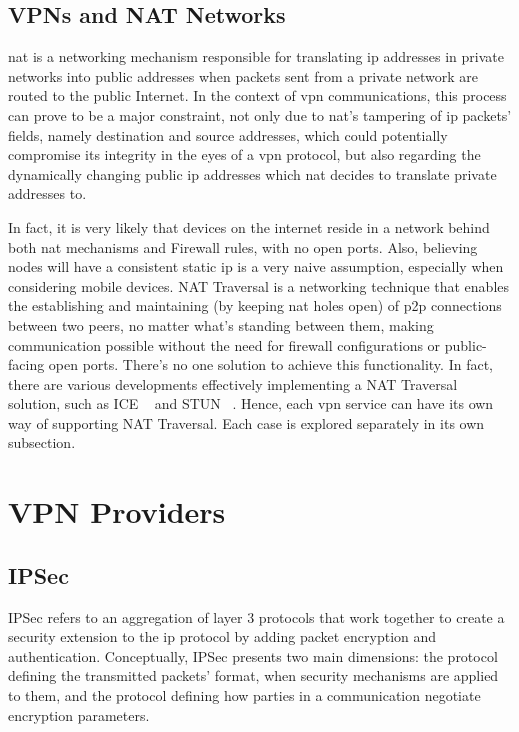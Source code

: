 \documentclass[11pt,twoside,a4paper]{report}
\begin{document}
\subsection{VPNs and NAT Networks}

\ac{nat} is a networking mechanism responsible for translating \ac{ip} addresses in private networks into public addresses when packets sent from a private network are routed to the public Internet. In the context of \ac{vpn} communications, this process can prove to be a major constraint, not only due to \ac{nat}'s tampering of \ac{ip} packets' fields, namely destination and source addresses, which could potentially compromise its integrity in the eyes of a \ac{vpn} protocol, but also regarding the dynamically changing public \ac{ip} addresses which \ac{nat} decides to translate private addresses to.

In fact, it is very likely that devices on the internet reside in a network behind both \ac{nat} mechanisms and Firewall rules, with no open ports. Also, believing nodes will have a consistent static \ac{ip} is a very naive assumption, especially when considering mobile devices. NAT Traversal is a networking technique that enables the establishing and maintaining (by keeping \ac{nat} holes open) of \ac{p2p} connections between two peers, no matter what's standing between them, making communication possible without the need for firewall configurations or public-facing open ports. There's no one solution to achieve this functionality. In fact, there are various developments effectively implementing a NAT Traversal solution, such as ICE ~\cite{rfc8445} and STUN ~\cite{rfc8489}. Hence, each \ac{vpn} service can have its own way of supporting NAT Traversal. Each case is explored separately in its own subsection.


\section{VPN Providers}

\subsection{IPSec}

IPSec refers to an aggregation of layer 3 protocols that work together to create a security extension to the \ac{ip} protocol by adding packet encryption and authentication. Conceptually, IPSec presents two main dimensions: the protocol defining the transmitted packets' format, when security mechanisms are applied to them, and the protocol defining how parties in a communication negotiate encryption parameters.
\end{document}

